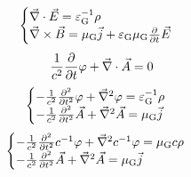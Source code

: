 \begin{equation}
    \begin{cases}
        \vec{\nabla}\cdot\vec{E}=\varepsilon_{\text{G}}^{-1}\rho\\
        \vec{\nabla}\times\vec{B}=\mu_{\text{G}}\vec{j}+\varepsilon_{\text{G}}\mu_{\text{G}}\frac{\partial}{\partial t}\vec{E}
    \end{cases}
\end{equation}
\begin{equation}
    \frac{1}{c^2}\frac{\partial}{\partial t}\varphi+\vec{\nabla}\cdot\vec{A}=0
\end{equation}
\begin{equation}
    \begin{cases}
        -\frac{1}{c^2}\frac{\partial^2}{\partial t^2}\varphi+\vec{\nabla}^2\varphi=\varepsilon_{\text{G}}^{-1}\rho\\
        -\frac{1}{c^2}\frac{\partial^2}{\partial t^2}\vec{A}+\vec{\nabla}^2\vec{A}=\mu_{\text{G}}\vec{j}
    \end{cases}
\end{equation}
\begin{equation}
    \begin{cases}
        -\frac{1}{c^2}\frac{\partial^2}{\partial t^2}c^{-1}\varphi+\vec{\nabla}^2c^{-1}\varphi=\mu_{\text{G}}c\rho\\
        -\frac{1}{c^2}\frac{\partial^2}{\partial t^2}\vec{A}+\vec{\nabla}^2\vec{A}=\mu_{\text{G}}\vec{j}
    \end{cases}
\end{equation}

